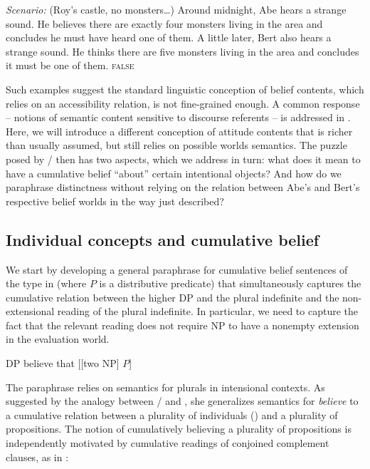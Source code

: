 \documentclass[output=paper]{langscibook}
\begin{document}
\eanoraggedright\sloppy
\label{sch-has:ex:22} \textit{Scenario:} (Roy's castle, no monsters\ldots) Around midnight, Abe hears a strange sound. He believes there are exactly four monsters living in the area and concludes he must have heard one of them. A little later, Bert also hears a strange sound. He thinks there are five monsters living in the area and concludes it must be one of them. \hfill {} \textsc{false}
\z

\begin{sloppypar}
\noindent Such examples suggest the standard linguistic conception of belief contents, which relies on an accessibility relation, is not fine-grained enough. A  common response  -- notions of semantic content sensitive to discourse referents -- is addressed in . Here, we will introduce a different conception of attitude contents that is richer than usually assumed, but still relies on possible worlds semantics. The puzzle posed by / then has two aspects, which we address in turn: what does it mean to have a cumulative belief ``about'' certain intentional objects? And how do we paraphrase distinctness without relying on the relation between Abe's and Bert's respective belief worlds in the way just described?
\end{sloppypar}

\subsection{Individual concepts and cumulative belief}\label{sch-has:sec:3.2}

We start by developing a general paraphrase for cumulative belief sentences of the type in  (where $P$ is a distributive predicate) that simultaneously captures the cumulative relation between the higher DP and the plural indefinite and the non-extensional reading of the plural indefinite. In particular, we need to capture the fact that the relevant reading does not require NP to have a nonempty extension in the evaluation world.

\ea\label{sch-has:ex:23} DP believe that [[two NP] $P$] \z

\noindent The paraphrase relies on  semantics for plurals in intensional contexts. As suggested by the analogy between / and , she generalizes  semantics for \textit{believe} to a cumulative relation between a plurality of individuals () and a plurality of propositions. The notion of cumulatively believing a plurality of propositions is independently motivated by cumulative readings of conjoined complement clauses, as in :
\end{document}
